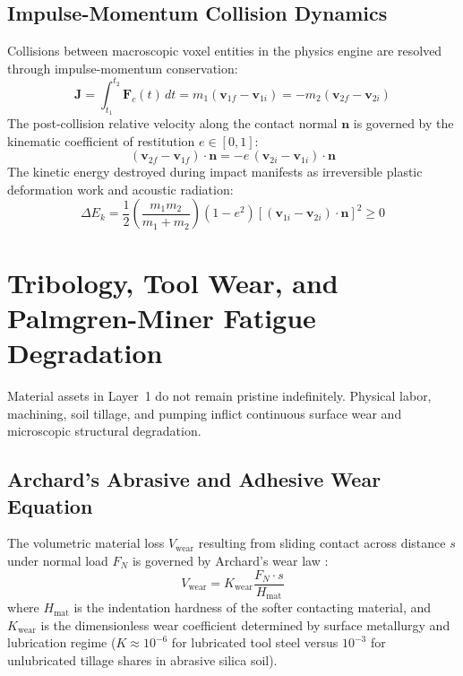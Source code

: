 \subsection{Impulse-Momentum Collision Dynamics}
Collisions between macroscopic voxel entities in the physics engine are resolved through impulse-momentum conservation:
\begin{equation}
\mathbf{J} = \int_{t_1}^{t_2} \mathbf{F}_c(t) \, dt = m_1 (\mathbf{v}_{1f} - \mathbf{v}_{1i}) = -m_2 (\mathbf{v}_{2f} - \mathbf{v}_{2i})
\label{eq:collision_impulse}
\end{equation}
The post-collision relative velocity along the contact normal $\mathbf{n}$ is governed by the kinematic coefficient of restitution $e \in [0, 1]$:
\begin{equation}
(\mathbf{v}_{2f} - \mathbf{v}_{1f}) \cdot \mathbf{n} = -e \, (\mathbf{v}_{2i} - \mathbf{v}_{1i}) \cdot \mathbf{n}
\label{eq:restitution_coefficient}
\end{equation}
The kinetic energy destroyed during impact manifests as irreversible plastic deformation work and acoustic radiation:
\begin{equation}
\Delta E_k = \frac{1}{2} \left( \frac{m_1 m_2}{m_1 + m_2} \right) (1 - e^2) \left[ (\mathbf{v}_{1i} - \mathbf{v}_{2i}) \cdot \mathbf{n} \right]^2 \ge 0
\label{eq:collision_energy_loss}
\end{equation}

\section{Tribology, Tool Wear, and Palmgren-Miner Fatigue Degradation}
\label{sec:mech_tribology}

Material assets in Layer~1 do not remain pristine indefinitely. Physical labor, machining, soil tillage, and pumping inflict continuous surface wear and microscopic structural degradation.

\subsection{Archard's Abrasive and Adhesive Wear Equation}
The volumetric material loss $V_{\mathrm{wear}}$ resulting from sliding contact across distance $s$ under normal load $F_N$ is governed by Archard's wear law \cite{dowling2012mechanical}:
\begin{equation}
V_{\mathrm{wear}} = K_{\mathrm{wear}} \frac{F_N \cdot s}{H_{\mathrm{mat}}}
\label{eq:archard_wear}
\end{equation}
where $H_{\mathrm{mat}}$ is the indentation hardness of the softer contacting material, and $K_{\mathrm{wear}}$ is the dimensionless wear coefficient determined by surface metallurgy and lubrication regime ($K \approx 10^{-6}$ for lubricated tool steel versus $10^{-3}$ for unlubricated tillage shares in abrasive silica soil).

